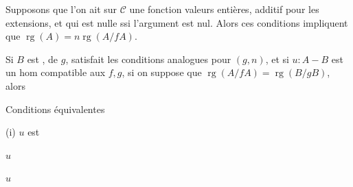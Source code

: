 
Supposons que l'on ait sur $\mathcal C$ une fonction  valeurs entières, additif pour les extensions, et qui est nulle ssi l'argument est nul. Alors ces conditions impliquent que
$\operatorname{rg}(A)=n\operatorname{rg}(A/fA)$.

 Si $B$ est ,  de $g$,  satisfait les conditions analogues pour $(g,n)$,
 et si $u:A-B$ est un hom compatible aux $f,g$,  si on suppose que $\operatorname{rg}(A/fA)=\operatorname{rg}(B/gB)$, alors

Conditions équivalentes

(i) $u$ est 

 $u$ 

 $u$ 

